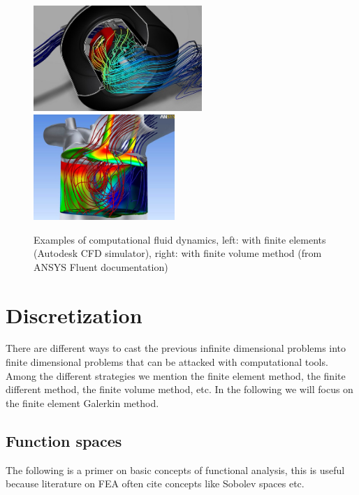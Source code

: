 \documentclass{digitaldynamics}
\begin{document}
\begin{itemize}
\end{itemize}


\begin{figure}
		\centering
			\includegraphics[height=4cm]{pics/es_cfd.jpg}
			\includegraphics[height=4cm]{pics/es_cfd2.jpg}
		\caption{Examples of computational fluid dynamics, left: with finite elements (Autodesk CFD simulator), right: with finite volume method (from ANSYS Fluent documentation)}
		\label{fig:es_cfd}
	\end{figure}



\newpage
\section{Discretization}

There are different ways to cast the previous infinite dimensional problems into finite dimensional problems that can be attacked with computational tools. Among the different strategies we mention the finite element method, the finite different method, the finite volume method, etc. In the following we will focus on the finite element Galerkin method.

\subsection{Function spaces}

The following is a primer on basic concepts of functional analysis, this is useful because literature on FEA often cite concepts like Sobolev spaces etc.
\end{document}
